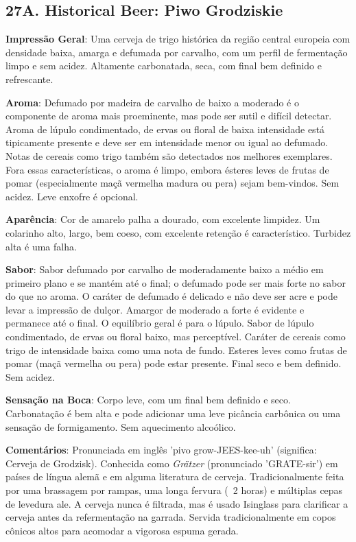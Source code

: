 \subsection*{27A. Historical Beer: Piwo Grodziskie}
\textbf{Impressão Geral}: Uma cerveja de trigo histórica da região central europeia com densidade baixa, amarga e defumada por carvalho, com um perfil de fermentação limpo e sem acidez. Altamente carbonatada, seca, com final bem definido e refrescante.

\textbf{Aroma}: Defumado por madeira de carvalho de baixo a moderado é o componente de aroma mais proeminente, mas pode ser sutil e difícil detectar. Aroma de lúpulo condimentado, de ervas ou floral de baixa intensidade está tipicamente presente e deve ser em intensidade menor ou igual ao defumado. Notas de cereais como trigo também são detectados nos melhores exemplares. Fora essas características, o aroma é limpo, embora ésteres leves de frutas de pomar (especialmente maçã vermelha madura ou pera) sejam bem-vindos. Sem acidez. Leve enxofre é opcional.

\textbf{Aparência}: Cor de amarelo palha a dourado, com excelente limpidez. Um colarinho alto, largo, bem coeso, com excelente retenção é característico. Turbidez alta é uma falha.

\textbf{Sabor}: Sabor defumado por carvalho de moderadamente baixo a médio em primeiro plano e se mantém até o final; o defumado pode ser mais forte no sabor do que no aroma. O caráter de defumado é delicado e não deve ser acre e pode levar a impressão de dulçor. Amargor de moderado a forte é evidente e permanece até o final. O equilíbrio geral é para o lúpulo. Sabor de lúpulo condimentado, de ervas ou floral baixo, mas perceptível. Caráter de cereais como trigo de intensidade baixa como uma nota de fundo. Esteres leves como frutas de pomar (maçã vermelha ou pera) pode estar presente. Final seco e bem definido. Sem acidez.

\textbf{Sensação na Boca}: Corpo leve, com um final bem definido e seco. Carbonatação é bem alta e pode adicionar uma leve picância carbônica ou uma sensação de formigamento. Sem aquecimento alcoólico.

\textbf{Comentários}: Pronunciada em inglês 'pivo grow-JEES-kee-uh' (significa: Cerveja de Grodzisk). Conhecida como \textit{Grätzer} (pronunciado 'GRATE-sir') em países de língua alemã e em alguma literatura de cerveja. Tradicionalmente feita por uma brassagem por rampas, uma longa fervura (~2 horas) e múltiplas cepas de levedura ale. A cerveja nunca é filtrada, mas é usado Isinglass para clarificar a cerveja antes da refermentação na garrada. Servida tradicionalmente em copos cônicos altos para acomodar a vigorosa espuma gerada.

